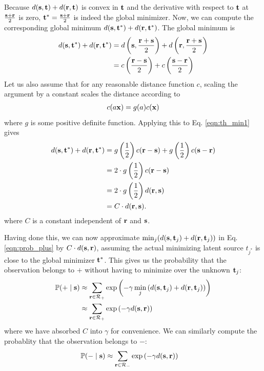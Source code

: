 Because $d(\mathbf s, \mathbf t) + d(\mathbf r, \mathbf t)$ is convex in $\mathbf t$ and the
derivative with respect to $\mathbf t$ at $\frac{\mathbf s + \mathbf r}{2}$ is zero, $\mathbf
t^* = \frac{\mathbf s + \mathbf r}{2}$ is indeed the global minimizer. Now, we can
compute the corresponding global minimum $d(\mathbf s,\mathbf t^*) + d(\mathbf r,\mathbf
t^*)$. The global minimum is
\begin{align}
d(\mathbf s,\mathbf t^*) + d(\mathbf r,\mathbf t^*) &= d\left(\mathbf s,\frac{\mathbf r + \mathbf s}{2}\right) + d\left(\mathbf r,\frac{\mathbf r + \mathbf s}{2}\right)\notag\\
&= c\left(\frac{\mathbf r - \mathbf s}{2}\right) + c\left(\frac{\mathbf s - \mathbf r}{2}\right) \label{eqn:th_min1}
\end{align}
Let us also assume that for any reasonable distance function $c$, scaling the
argument by a constant scales the distance according to
\begin{gather}
c(a\mathbf x) = g(a)c(\mathbf x)
\end{gather}
where $g$ is some positive definite function. Applying this to Eq. \ref{eqn:th_min1} gives
\begin{align}
d(\mathbf s,\mathbf t^*) + d(\mathbf r,\mathbf t^*) &= g\left(\frac{1}{2}\right) c(\mathbf r - \mathbf s) +  g\left(\frac{1}{2}\right) c(\mathbf s - \mathbf r)\notag\\
&= 2 \cdot g\left(\frac{1}{2}\right) c(\mathbf r - \mathbf s)\notag\\
&= 2 \cdot g\left(\frac{1}{2}\right) d(\mathbf r, \mathbf s)\notag\\
&= C \cdot d(\mathbf r, \mathbf s).
\end{align}
where $C$ is a constant independent of $\mathbf r$ and $\mathbf s$.

Having done this, we can now approximate $\min_j (d(\mathbf s,\mathbf t_j) + d(\mathbf r,\mathbf
t_j))$ in Eq. \ref{eqn:prob_plus} by $C \cdot d(\mathbf s,\mathbf r)$, assuming the
actual minimizing latent source $t_{j^*}$ is close to the global minimizer
$\mathbf t^*$. This gives us the probability that the observation belongs to $+$ without
having to minimize over the unknown $\mathbf t_j$:
\begin{align}
\mathbb{P}(+ \;|\;\mathbf s) &\approx \sum_{\mathbf r \in \mathcal{R}_+}
\exp{\left(-\gamma \min_{j} \left( d(\mathbf s,\mathbf t_j) + d(\mathbf r,\mathbf t_j) \right) \right)}\notag\\
&\approx \sum_{\mathbf r \in \mathcal{R}_+} \exp
\left(-\gamma d(\mathbf s,\mathbf r)\right) \label{eqn:prob_plus_approx}
\end{align}
where we have absorbed $C$ into $\gamma$ for convenience. We can similarly compute the probablity that the observation belongs to $-$:
\begin{align}
\mathbb{P}(- \;|\; \mathbf s ) &\approx \sum_{\mathbf r \in
  \mathcal{R}_-} \exp \left(-\gamma d(\mathbf s,\mathbf
  r)\right) \label{eqn:prob_minus_approx}
\end{align}

